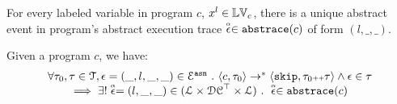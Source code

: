 %
For every labeled variable in program $c$, $x^l \in \lvar_c$, there is a unique abstract event in program's abstract execution trace $\absevent \in \absflow(c)$ of form $(l, \_, \_)$. 
\begin{lem}
\label{lem:absevent_unique}
Given a program ${c}$, we have:
%
\[
\begin{array}{l}
 \forall \vtrace_0, \trace \in \mathcal{T} ,  \event = (\_, l, \_, \_) \in \eventset^{\asn} \st
\config{{c}, \trace_0} \to^{*} \config{\eskip, \trace_0 \tracecat \vtrace} 
\land \event \in \trace 
\\
\qquad \implies \exists! \absevent = (l, \_, \_) \in (\ldom\times \dcdom^{\top} \times \ldom) \st 
\absevent \in \absflow(c)
\end{array}
\]
\end{lem}
